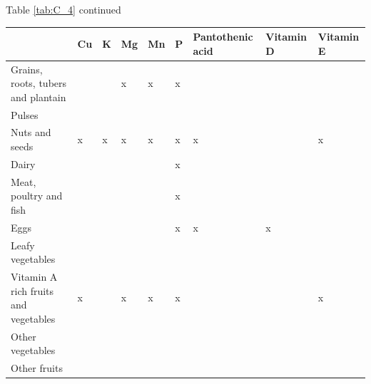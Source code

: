 \begin{table}[H]
  \small
  \raggedright Table \ref{tab:C_4} continued
\begin{tabularx}{\textwidth}%
  {
p{}
p{}
p{}
p{}
p{}
p{}
p{}
p{}
p{}}
\toprule
~ & Cu & K & Mg & Mn & P & Pantothenic acid & Vitamin D & Vitamin E \\
\midrule
Grains, roots, tubers and plantain & & & x & x & x & & & \\
Pulses & & & & & & & & \\
Nuts and seeds & x & x & x & x & x & x & & x \\
Dairy & & & & & x & & & \\
Meat, poultry and fish & & & & & x & & & \\
Eggs & & & & & x & x & x & \\
Leafy vegetables & & & & & & & & \\
Vitamin A rich fruits and vegetables & x & & x & x & x & & & x \\
Other vegetables & & & & & & & & \\
Other fruits & & & & & & & & \\
\bottomrule
\end{tabularx}
\end{table}




